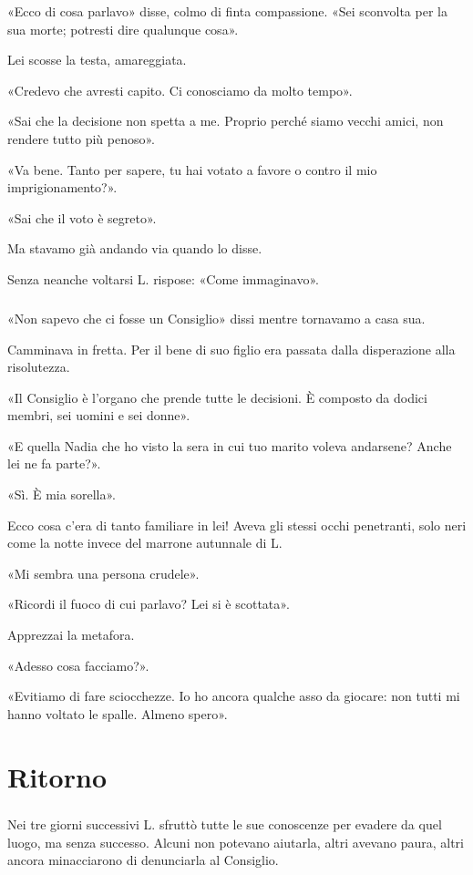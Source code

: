 \documentclass[a4paper,12pt]{book}
\begin{document}
«Ecco di cosa parlavo» disse, colmo di finta compassione. «Sei sconvolta per la
sua morte; potresti dire qualunque cosa».

Lei scosse la testa, amareggiata.

«Credevo che avresti capito. Ci conosciamo da molto tempo».

«Sai che la decisione non spetta a me. Proprio perché siamo vecchi amici, non
rendere tutto più penoso».

«Va bene. Tanto per sapere, tu hai votato a favore o contro il mio
imprigionamento?».

«Sai che il voto è segreto».

Ma stavamo già andando via quando lo disse.

Senza neanche voltarsi L. rispose: «Come immaginavo».

\paragraph{}
«Non sapevo che ci fosse un Consiglio» dissi mentre tornavamo a casa sua.

Camminava in fretta. Per il bene di suo figlio era passata dalla disperazione
alla risolutezza.

«Il Consiglio è l'organo che prende tutte le decisioni. È composto da dodici
membri, sei uomini e sei donne».

«E quella Nadia che ho visto la sera in cui tuo marito voleva andarsene? Anche
lei ne fa parte?».

«Sì. È mia sorella».

Ecco cosa c'era di tanto familiare in lei! Aveva gli stessi occhi penetranti,
solo neri come la notte invece del marrone autunnale di L.

«Mi sembra una persona crudele».

«Ricordi il fuoco di cui parlavo? Lei si è scottata».

Apprezzai la metafora.

«Adesso cosa facciamo?».

«Evitiamo di fare sciocchezze. Io ho ancora qualche asso da giocare: non tutti
mi hanno voltato le spalle. Almeno spero».

\chapter{Ritorno}

\paragraph{}
Nei tre giorni successivi L. sfruttò tutte le sue conoscenze per evadere da quel
luogo, ma senza successo. Alcuni non potevano aiutarla, altri avevano paura,
altri ancora minacciarono di denunciarla al Consiglio.
\end{document}
